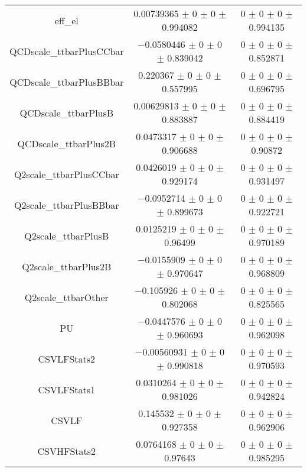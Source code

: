 \begin{table}
\begin{tabular}{ccc}
eff\_el & \num{0.00739365} $\pm$ \num{0} $\pm$ \num{0} $\pm$ \num{0.994082} & \num{0} $\pm$ \num{0} $\pm$ \num{0} $\pm$ \num{0.994135}\\
QCDscale\_ttbarPlusCCbar & \num{-0.0580446} $\pm$ \num{0} $\pm$ \num{0} $\pm$ \num{0.839042} & \num{0} $\pm$ \num{0} $\pm$ \num{0} $\pm$ \num{0.852871}\\
QCDscale\_ttbarPlusBBbar & \num{0.220367} $\pm$ \num{0} $\pm$ \num{0} $\pm$ \num{0.557995} & \num{0} $\pm$ \num{0} $\pm$ \num{0} $\pm$ \num{0.696795}\\
QCDscale\_ttbarPlusB & \num{0.00629813} $\pm$ \num{0} $\pm$ \num{0} $\pm$ \num{0.883887} & \num{0} $\pm$ \num{0} $\pm$ \num{0} $\pm$ \num{0.884419}\\
QCDscale\_ttbarPlus2B & \num{0.0473317} $\pm$ \num{0} $\pm$ \num{0} $\pm$ \num{0.906688} & \num{0} $\pm$ \num{0} $\pm$ \num{0} $\pm$ \num{0.90872}\\
Q2scale\_ttbarPlusCCbar & \num{0.0426019} $\pm$ \num{0} $\pm$ \num{0} $\pm$ \num{0.929174} & \num{0} $\pm$ \num{0} $\pm$ \num{0} $\pm$ \num{0.931497}\\
Q2scale\_ttbarPlusBBbar & \num{-0.0952714} $\pm$ \num{0} $\pm$ \num{0} $\pm$ \num{0.899673} & \num{0} $\pm$ \num{0} $\pm$ \num{0} $\pm$ \num{0.922721}\\
Q2scale\_ttbarPlusB & \num{0.0125219} $\pm$ \num{0} $\pm$ \num{0} $\pm$ \num{0.96499} & \num{0} $\pm$ \num{0} $\pm$ \num{0} $\pm$ \num{0.970189}\\
Q2scale\_ttbarPlus2B & \num{-0.0155909} $\pm$ \num{0} $\pm$ \num{0} $\pm$ \num{0.970647} & \num{0} $\pm$ \num{0} $\pm$ \num{0} $\pm$ \num{0.968809}\\
Q2scale\_ttbarOther & \num{-0.105926} $\pm$ \num{0} $\pm$ \num{0} $\pm$ \num{0.802068} & \num{0} $\pm$ \num{0} $\pm$ \num{0} $\pm$ \num{0.825565}\\
PU & \num{-0.0447576} $\pm$ \num{0} $\pm$ \num{0} $\pm$ \num{0.960693} & \num{0} $\pm$ \num{0} $\pm$ \num{0} $\pm$ \num{0.962098}\\
CSVLFStats2 & \num{-0.00560931} $\pm$ \num{0} $\pm$ \num{0} $\pm$ \num{0.990818} & \num{0} $\pm$ \num{0} $\pm$ \num{0} $\pm$ \num{0.970593}\\
CSVLFStats1 & \num{0.0310264} $\pm$ \num{0} $\pm$ \num{0} $\pm$ \num{0.981026} & \num{0} $\pm$ \num{0} $\pm$ \num{0} $\pm$ \num{0.942824}\\
CSVLF & \num{0.145532} $\pm$ \num{0} $\pm$ \num{0} $\pm$ \num{0.927358} & \num{0} $\pm$ \num{0} $\pm$ \num{0} $\pm$ \num{0.962906}\\
CSVHFStats2 & \num{0.0764168} $\pm$ \num{0} $\pm$ \num{0} $\pm$ \num{0.97643} & \num{0} $\pm$ \num{0} $\pm$ \num{0} $\pm$ \num{0.985295}\\

\end{tabular}
\end{table}
